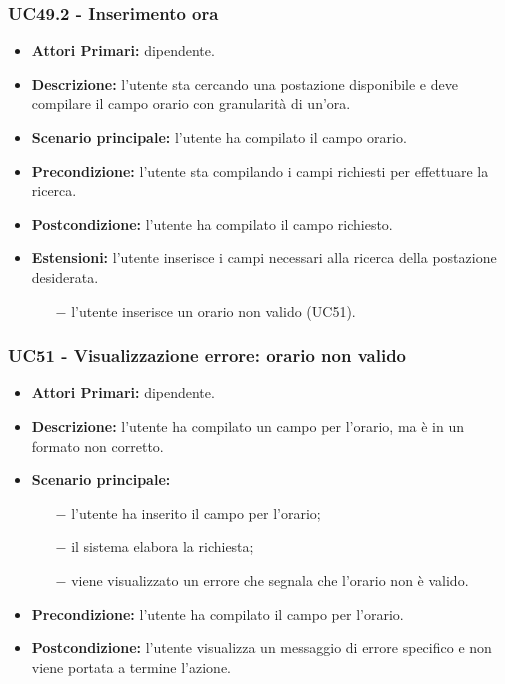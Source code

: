 \subsubsection{ UC49.2 - Inserimento ora }
\begin{itemize}
	\item\textbf{Attori Primari:} dipendente.
	\item\textbf{Descrizione:} l’utente sta cercando una postazione disponibile e deve compilare il campo orario con granularità di un'ora.
	\item\textbf{Scenario principale:} l’utente ha compilato il campo orario.
	\item\textbf{Precondizione:} l’utente sta compilando i campi richiesti per effettuare la ricerca.
	\item\textbf{Postcondizione:} l’utente ha compilato il campo richiesto.
	\item\textbf{Estensioni:} l’utente inserisce i campi necessari alla ricerca della postazione desiderata.
	\begin{itemize}
		\item[$-$] l’utente inserisce un orario non valido (UC51).
	\end{itemize}
\end{itemize}
\subsubsection{ UC51 - Visualizzazione errore: orario non valido }
\begin{itemize}
	\item\textbf{Attori Primari:} dipendente.
	\item\textbf{Descrizione:} l’utente ha compilato un campo per l'orario, ma è in un formato non corretto.
	\item\textbf{Scenario principale:} 
	\begin{itemize}
		\item[$-$] l’utente ha inserito il campo per l'orario;
		\item[$-$] il sistema elabora la richiesta;
		\item[$-$] viene visualizzato un errore che segnala che l'orario non è valido.
	\end{itemize}
	\item\textbf{Precondizione:} l’utente ha compilato il campo per l'orario.
	\item\textbf{Postcondizione:} l’utente visualizza un messaggio di errore specifico e non viene portata a termine l'azione.
\end{itemize}
